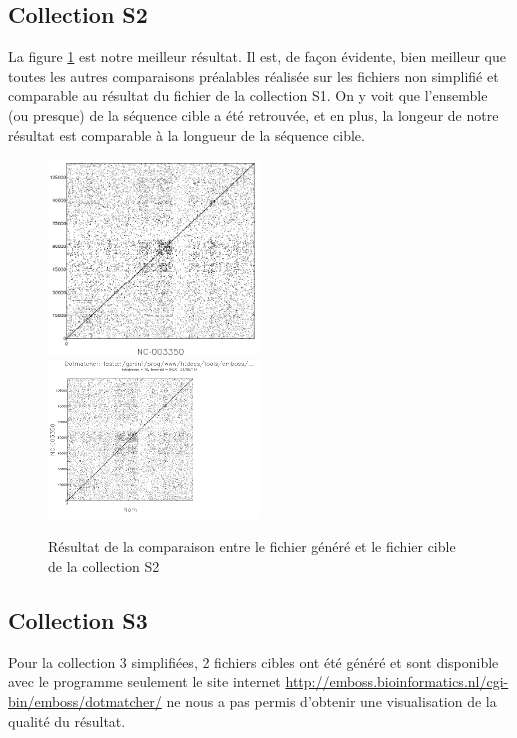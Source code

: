 \documentclass[12pt,a4paper,final]{article}
\begin{document}
\subsection{Collection S2}
La figure \ref{collS2} est notre meilleur résultat. Il est, de façon évidente, bien meilleur que toutes les autres comparaisons préalables réalisée sur les fichiers non simplifié et comparable au résultat du fichier de la collection S1. On y voit que l'ensemble (ou presque) de la séquence cible a été retrouvée, et en plus, la longeur de notre résultat est comparable à la longueur de la séquence cible.

\begin{figure}[!ht]
	\centering
	\includegraphics[width=0.5\textwidth]{images/collectionS2/collectionS2.png}
	\includegraphics[width=0.5\textwidth]{images/collectionS2/collectionS2_2.png}
	\caption{\label{collS2}Résultat de la comparaison entre le fichier généré et le fichier cible de la collection S2}
\end{figure}

\subsection{Collection S3}
Pour la collection 3 simplifiées, 2 fichiers cibles ont été généré et sont disponible avec le programme seulement le site internet \url{http://emboss.bioinformatics.nl/cgi-bin/emboss/dotmatcher/} ne nous a pas permis d'obtenir une visualisation de la qualité du résultat.
\end{document}
